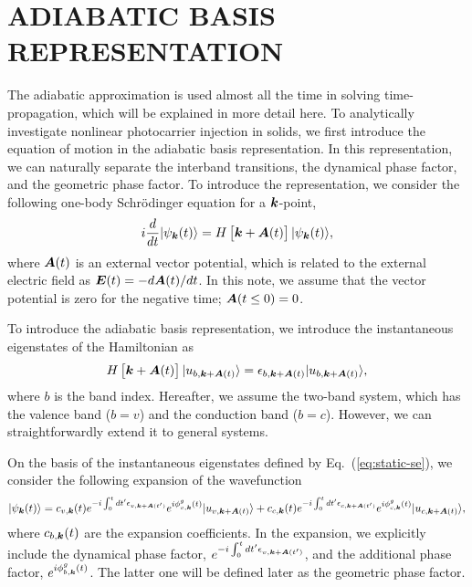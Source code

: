 \chapter{ADIABATIC BASIS REPRESENTATION \label{ch:A_ADIABATIC}}
\label{ch:Adiabatic}
The adiabatic approximation is used almost all the time in solving time-propagation, which will be
explained in more detail here.
To analytically investigate nonlinear photocarrier injection in solids, we first introduce the equation of motion in the adiabatic basis representation. In this representation, we can naturally separate the interband transitions, the dynamical phase factor, and the geometric phase factor. To introduce the representation, we consider the following one-body Schr\"odinger equation for a $\boldsymbol k$-point,
\begin{equation}
i \frac{d}{dt} | \psi_{\boldsymbol k}(t) \rangle = H \left [\boldsymbol k + \boldsymbol A(t) \right ] | \psi_{\boldsymbol k}(t) \rangle,
\label{eqn:tdse00}
\end{equation}
where $\boldsymbol A(t)$ is an external vector potential, which is related to the external electric field as $\boldsymbol E(t)=-d\boldsymbol A(t)/dt$. In this note, we assume that the vector potential is zero for the negative time; $\boldsymbol A(t\leq 0)=0$.

To introduce the adiabatic basis representation, we introduce the instantaneous eigenstates of the Hamiltonian as
\begin{align}
H\left [\boldsymbol k + \boldsymbol A(t) \right ] |u_{b,\boldsymbol k+\boldsymbol A(t)}\rangle = \epsilon_{b,\boldsymbol k + \boldsymbol A(t)}|u_{b,\boldsymbol k+\boldsymbol A(t)}\rangle,
\label{eq:static-se}
\end{align}
where $b$ is the band index. Hereafter, we assume the two-band system, which has the valence band ($b=v$) and the conduction band ($b=c$). However, we can straightforwardly extend it to general systems.

On the basis of the instantaneous eigenstates defined by Eq.~(\ref{eq:static-se}), we consider the following expansion of the wavefunction
\begin{align}
|\psi_{\boldsymbol k}(t)\rangle = c_{v,\boldsymbol k}(t) e^{-i\int^t_0dt' \epsilon_{v,\boldsymbol k+ \boldsymbol A(t')}} e^{i\phi^g_{v,\boldsymbol k}(t)} |u_{v,\boldsymbol k+\boldsymbol A(t)}\rangle
+c_{c,\boldsymbol k}(t) e^{-i\int^t_0dt' \epsilon_{c,\boldsymbol k+ \boldsymbol A(t')}} e^{i\phi^g_{c,\boldsymbol k}(t)} |u_{c,\boldsymbol k+\boldsymbol A(t)}\rangle,
\label{eq:ansatz}
\end{align}
where $c_{b,\boldsymbol k}(t)$ are the expansion coefficients. In the expansion, we explicitly include the dynamical phase factor, $e^{-i\int^t_0dt' \epsilon_{v,\boldsymbol k+ \boldsymbol A(t')}}$, and the additional phase factor, $e^{i\phi^g_{b,\boldsymbol k}(t)}$. The latter one will be defined later as the geometric phase factor.

